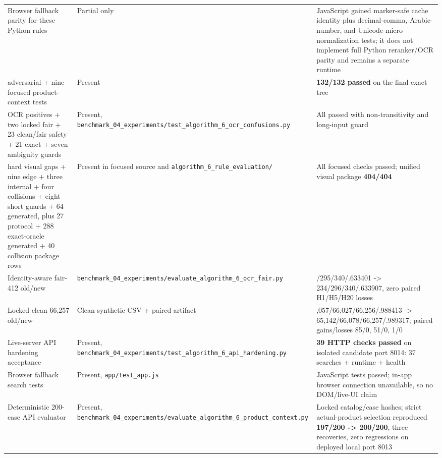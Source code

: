 {\begin{longtable}[]{@{}>{\RaggedRight\arraybackslash}p{.22\linewidth}>{\RaggedRight\arraybackslash}p{.34\linewidth}>{\RaggedRight\arraybackslash}p{.36\linewidth}@{}}
Browser fallback parity for these Python rules & Partial only & JavaScript gained marker-safe cache identity plus decimal-comma, Arabic-number, and Unicode-micro normalization tests; it does not implement full Python reranker/OCR parity and remains a separate runtime \\
123 adversarial + nine focused product-context tests & Present & \textbf{132/132 passed} on the final exact tree \\
23 OCR positives + two locked fair + 23 clean/fair safety + 21 exact + seven ambiguity guards & Present, \texttt{benchmark\_\allowbreak{}04\_\allowbreak{}experiments/test\_\allowbreak{}algorithm\_\allowbreak{}6\_\allowbreak{}ocr\_\allowbreak{}confusions.py} & All passed with non-transitivity and long-input guard \\
20 hard visual gaps + nine edge + three internal + four collisions + eight short guards + 64 generated, plus 27 protocol + 288 exact-oracle generated + 40 collision package rows & Present in focused source and \texttt{algorithm\_\allowbreak{}6\_\allowbreak{}rule\_\allowbreak{}evaluation/} & All focused checks passed; unified visual package \textbf{404/404} \\
Identity-aware fair-412 old/new & \texttt{benchmark\_\allowbreak{}04\_\allowbreak{}experiments/evaluate\_\allowbreak{}algorithm\_\allowbreak{}6\_\allowbreak{}ocr\_\allowbreak{}fair.py} & 234/295/340/.633401 -\textgreater{} 234/296/340/.633907, zero paired H1/H5/H20 losses \\
Locked clean 66,257 old/new & Clean synthetic CSV + paired artifact & 65,057/66,027/66,256/.988413 -\textgreater{} 65,142/66,078/66,257/.989317; paired gains/losses 85/0, 51/0, 1/0 \\
Live-server API hardening acceptance & Present, \texttt{benchmark\_\allowbreak{}04\_\allowbreak{}experiments/test\_\allowbreak{}algorithm\_\allowbreak{}6\_\allowbreak{}api\_\allowbreak{}hardening.py} & \textbf{39 HTTP checks passed} on isolated candidate port 8014: 37 searches + runtime + health \\
Browser fallback search tests & Present, \texttt{app/test\_\allowbreak{}app.js} & JavaScript tests passed; in-app browser connection unavailable, so no DOM/live-UI claim \\
Deterministic 200-case API evaluator & Present, \texttt{benchmark\_\allowbreak{}04\_\allowbreak{}experiments/evaluate\_\allowbreak{}algorithm\_\allowbreak{}6\_\allowbreak{}product\_\allowbreak{}context.py} & Locked catalog/case hashes; strict actual-product selection reproduced \textbf{197/200 -\textgreater{} 200/200}, three recoveries, zero regressions on deployed local port 8013 \\
\end{longtable}
}

